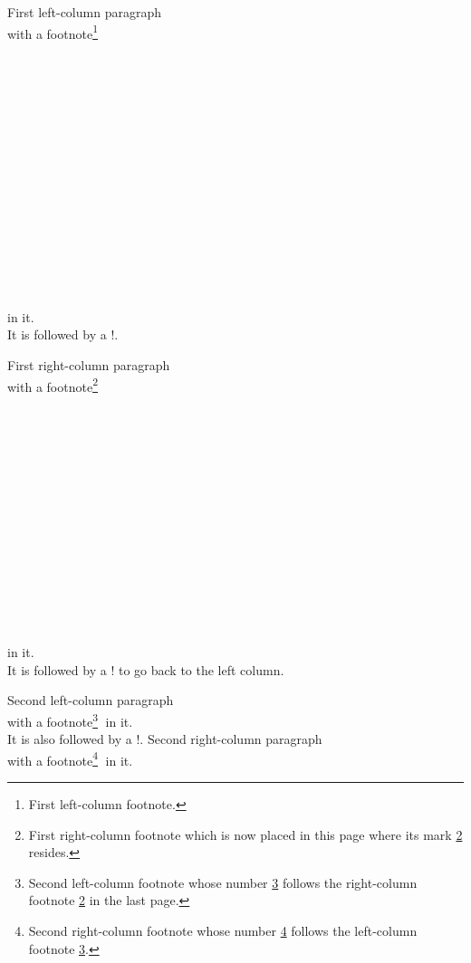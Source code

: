 \Hrule
\begin{paracol}{2}
First left-column paragraph \Dotfill\\
\Dotfill with a footnote\footnote{First left-column
footnote.\label{fn:7L1}}\Dotfill\\
\Dotfill\\ \Dotfill\\ \Dotfill\\ \Dotfill\\ \Dotfill\\ \Dotfill\\ \Dotfill\\
\Dotfill\\ \Dotfill\\ \Dotfill\\ \Dotfill\\ \Dotfill\\ \Dotfill\\ \Dotfill\\
\Dotfill\\
\Dotfill in it.\\
It is followed by a \!\switchcolumn!.
\par\switchcolumn
First right-column paragraph \Dotfill\\
\Dotfill with a footnote\footnote{First right-column
footnote which is now placed in this page where its mark \ref{fn:7R1}
resides.\label{fn:7R1}}\Dotfill\\
\Dotfill\\ \Dotfill\\ \Dotfill\\ \Dotfill\\ \Dotfill\\ \Dotfill\\ \Dotfill\\
\Dotfill\\ \Dotfill\\ \Dotfill\\ \Dotfill\\ \Dotfill\\ \Dotfill\\ \Dotfill\\
\Dotfill in it.\\
It is followed by a \!\switchcolumn! to go back to the left column.
\par\newpage\switchcolumn
Second left-column paragraph \Dotfill\\
\Dotfill with a footnote\footnote{Second left-column
footnote whose number \ref{fn:7L2} follows the right-column footnote
\ref{fn:7R1} in the last page.\label{fn:7L2}}
\Dotfill in it.\\
It is also followed by a \!\switchcolumn!.
\switchcolumn
Second right-column paragraph \Dotfill\\
\Dotfill with a footnote\footnote{Second right-column
footnote whose number \ref{fn:7R2} follows the left-column footnote
\ref{fn:7L2}.\label{fn:7R2}}
\Dotfill in it.
\end{paracol}
\Hrule

